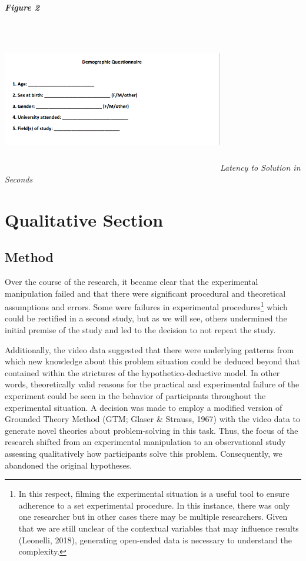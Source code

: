\hypertarget{section}{%
\subparagraph{}\label{section}}

\hypertarget{figure-2}{%
\subparagraph{Figure 2}\label{figure-2}}

\includegraphics[width=3.8125in,height=2.54097in]{media/image2.png}\emph{Latency
to Solution in Seconds}

\hypertarget{qualitative-section}{%
\section{Qualitative Section}\label{qualitative-section}}

\hypertarget{method-1}{%
\subsection{Method}\label{method-1}}

Over the course of the research, it became clear that the experimental
manipulation failed and that there were significant procedural and
theoretical assumptions and errors. Some were failures in experimental
procedures\footnote{ In this respect, filming the experimental situation
  is a useful tool to ensure adherence to a set experimental procedure.
  In this instance, there was only one researcher but in other cases
  there may be multiple researchers. Given that we are still unclear of
  the contextual variables that may influence results (Leonelli, 2018),
  generating open-ended data is necessary to understand the complexity.}
which could be rectified in a second study, but as we will see, others
undermined the initial premise of the study and led to the decision to
not repeat the study.

Additionally, the video data suggested that there were underlying
patterns from which new knowledge about this problem situation could be
deduced beyond that contained within the strictures of the
hypothetico-deductive model. In other words, theoretically valid reasons
for the practical and experimental failure of the experiment could be
seen in the behavior of participants throughout the experimental
situation. A decision was made to employ a modified version of Grounded
Theory Method (GTM; Glaser \& Strauss, 1967) with the video data to
generate novel theories about problem-solving in this task. Thus, the
focus of the research shifted from an experimental manipulation to an
observational study assessing qualitatively how participants solve this
problem. Consequently, we abandoned the original hypotheses.

